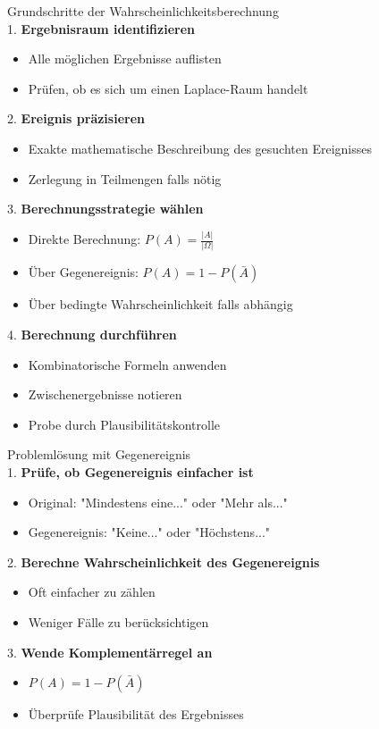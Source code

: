 \begin{KR}{Grundschritte der Wahrscheinlichkeitsberechnung}\\
1. \textbf{Ergebnisraum identifizieren}
   \begin{itemize}
   \item Alle möglichen Ergebnisse auflisten
   \item Prüfen, ob es sich um einen Laplace-Raum handelt
   \end{itemize}

2. \textbf{Ereignis präzisieren}
   \begin{itemize}
   \item Exakte mathematische Beschreibung des gesuchten Ereignisses
   \item Zerlegung in Teilmengen falls nötig
   \end{itemize}

3. \textbf{Berechnungsstrategie wählen}
   \begin{itemize}
   \item Direkte Berechnung: $P(A) = \frac{|A|}{|\Omega|}$
   \item Über Gegenereignis: $P(A) = 1 - P(\bar{A})$
   \item Über bedingte Wahrscheinlichkeit falls abhängig
   \end{itemize}

4. \textbf{Berechnung durchführen}
   \begin{itemize}
   \item Kombinatorische Formeln anwenden
   \item Zwischenergebnisse notieren
   \item Probe durch Plausibilitätskontrolle
   \end{itemize}
\end{KR}

\begin{KR}{Problemlösung mit Gegenereignis}\\
1. \textbf{Prüfe, ob Gegenereignis einfacher ist}
   \begin{itemize}
   \item Original: "Mindestens eine..." oder "Mehr als..."
   \item Gegenereignis: "Keine..." oder "Höchstens..."
   \end{itemize}

2. \textbf{Berechne Wahrscheinlichkeit des Gegenereignis}
   \begin{itemize}
   \item Oft einfacher zu zählen
   \item Weniger Fälle zu berücksichtigen
   \end{itemize}

3. \textbf{Wende Komplementärregel an}
   \begin{itemize}
   \item $P(A) = 1 - P(\bar{A})$
   \item Überprüfe Plausibilität des Ergebnisses
   \end{itemize}
\end{KR}

